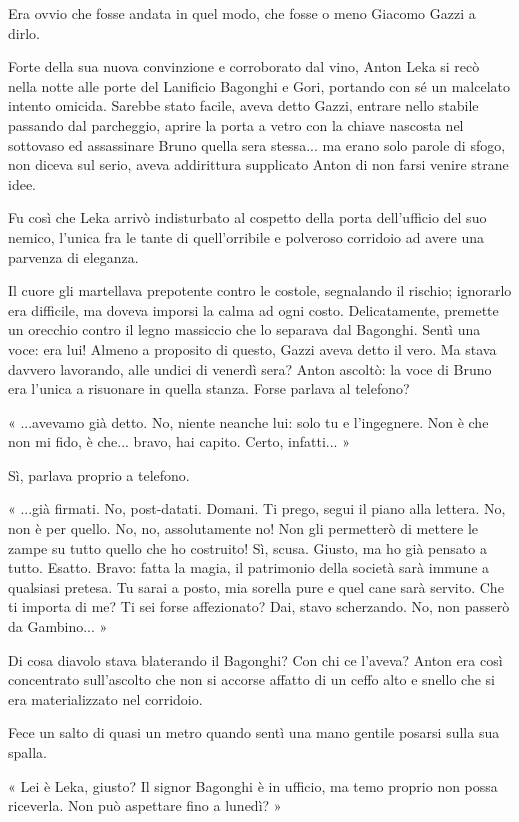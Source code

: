 Era ovvio che fosse andata in quel modo, che fosse o meno Giacomo Gazzi a dirlo.

Forte della sua nuova convinzione e corroborato dal vino, Anton Leka si recò nella notte alle porte del Lanificio Bagonghi e Gori, portando con sé un malcelato intento omicida. Sarebbe stato facile, aveva detto Gazzi, entrare nello stabile passando dal parcheggio, aprire la porta a vetro con la chiave nascosta nel sottovaso ed assassinare Bruno quella sera stessa... ma erano solo parole di sfogo, non diceva sul serio, aveva addirittura supplicato Anton di non farsi venire strane idee.

Fu così che Leka arrivò indisturbato al cospetto della porta dell'ufficio del suo nemico, l'unica fra le tante di quell'orribile e polveroso corridoio ad avere una parvenza di eleganza.

Il cuore gli martellava prepotente contro le costole, segnalando il rischio; ignorarlo era difficile, ma doveva imporsi la calma ad ogni costo. Delicatamente, premette un orecchio contro il legno massiccio che lo separava dal Bagonghi. Sentì una voce: era lui! Almeno a proposito di questo, Gazzi aveva detto il vero. Ma stava davvero lavorando, alle undici di venerdì sera? Anton ascoltò: la voce di Bruno era l'unica a risuonare in quella stanza. Forse parlava al telefono?

« ...avevamo già detto. No, niente neanche lui: solo tu e l'ingegnere. Non è che non mi fido, è che... bravo, hai capito. Certo, infatti... »

Sì, parlava proprio a telefono.

« ...già firmati. No, post-datati. Domani. Ti prego, segui il piano alla lettera. No, non è per quello. No, no, assolutamente no! Non gli permetterò di mettere le zampe su tutto quello che ho costruito! Sì, scusa. Giusto, ma ho già pensato a tutto. Esatto. Bravo: fatta la magia, il patrimonio della società sarà immune a qualsiasi pretesa. Tu sarai a posto, mia sorella pure e quel cane sarà servito. Che ti importa di me? Ti sei forse affezionato? Dai, stavo scherzando. No, non passerò da Gambino... »

Di cosa diavolo stava blaterando il Bagonghi? Con chi ce l'aveva? Anton era così concentrato sull'ascolto che non si accorse affatto di un ceffo alto e snello che si era materializzato nel corridoio.

Fece un salto di quasi un metro quando sentì una mano gentile posarsi sulla sua spalla.

« Lei è Leka, giusto? Il signor Bagonghi è in ufficio, ma temo proprio non possa riceverla. Non può aspettare fino a lunedì? »

